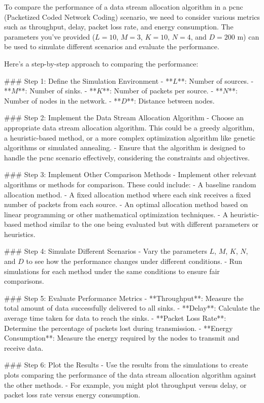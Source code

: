 To compare the performance of a data stream allocation algorithm in a \gls{pcnc} (Packetized Coded Network Coding) scenario, we need to consider various metrics such as throughput, delay, packet loss rate, and energy consumption. The parameters you've provided (\( L = 10 \), \( M = 3 \), \( K = 10 \), \( N = 4 \), and \( D = 200 \) m) can be used to simulate different scenarios and evaluate the performance.

Here's a step-by-step approach to comparing the performance:

### Step 1: Define the Simulation Environment
- **\( L \)**: Number of sources.
- **\( M \)**: Number of sinks.
- **\( K \)**: Number of packets per source.
- **\( N \)**: Number of nodes in the network.
- **\( D \)**: Distance between nodes.

### Step 2: Implement the Data Stream Allocation Algorithm
- Choose an appropriate data stream allocation algorithm. This could be a greedy algorithm, a heuristic-based method, or a more complex optimization algorithm like genetic algorithms or simulated annealing.
- Ensure that the algorithm is designed to handle the \gls{pcnc} scenario effectively, considering the constraints and objectives.

### Step 3: Implement Other Comparison Methods
- Implement other relevant algorithms or methods for comparison. These could include:
  - A baseline random allocation method.
  - A fixed allocation method where each sink receives a fixed number of packets from each source.
  - An optimal allocation method based on linear programming or other mathematical optimization techniques.
  - A heuristic-based method similar to the one being evaluated but with different parameters or heuristics.

### Step 4: Simulate Different Scenarios
- Vary the parameters \( L \), \( M \), \( K \), \( N \), and \( D \) to see how the performance changes under different conditions.
- Run simulations for each method under the same conditions to ensure fair comparisons.

### Step 5: Evaluate Performance Metrics
- **Throughput**: Measure the total amount of data successfully delivered to all sinks.
- **Delay**: Calculate the average time taken for data to reach the sinks.
- **Packet Loss Rate**: Determine the percentage of packets lost during transmission.
- **Energy Consumption**: Measure the energy required by the nodes to transmit and receive data.

### Step 6: Plot the Results
- Use the results from the simulations to create plots comparing the performance of the data stream allocation algorithm against the other methods.
- For example, you might plot throughput versus delay, or packet loss rate versus energy consumption.

